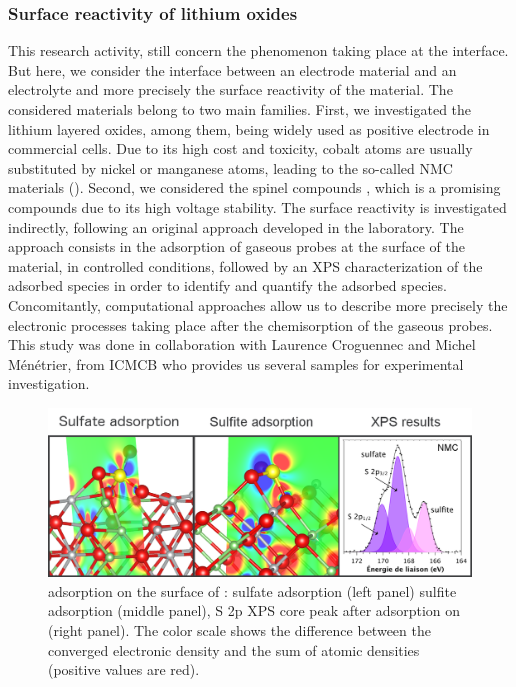\documentclass[11pt]{artuppax}
\newcounter{subsec}[section]
\begin{document}
\subsubsection{Surface reactivity of lithium oxides}

This research activity, still concern the phenomenon taking place at the interface. But here, we consider
the interface between an electrode material and an electrolyte and more precisely the surface reactivity
of the material. The considered materials belong to two main families. First, we investigated the lithium
layered oxides, among them,  being widely used as positive electrode in commercial cells.
Due to its high cost and toxicity, cobalt atoms are usually substituted by nickel or manganese atoms,
leading to the so-called NMC materials (). Second, we considered the spinel
compounds , which is a promising compounds due to its high voltage stability. The
surface reactivity is investigated indirectly, following an original approach developed in the laboratory.
The approach consists in the adsorption of gaseous probes at the surface of the material, in controlled conditions,
followed by an XPS characterization of the adsorbed species in order to identify and quantify the adsorbed
species. Concomitantly, computational approaches allow us to
describe more precisely the electronic processes taking place after the chemisorption of the gaseous
probes. This study was done in collaboration with Laurence
Croguennec and Michel Ménétrier, from ICMCB who provides us several samples for experimental investigation.

\begin{figure}[h]
    \centering
    \includegraphics[width=.8\textwidth]{img/so2}
    \caption{ adsorption on the surface of : sulfate adsorption (left panel)
    sulfite adsorption (middle panel), S 2p XPS core peak after  adsorption on
    (right panel). The color scale shows
    the difference between the converged electronic density and the sum of atomic densities
    (positive values are red).}
    \label{fig:SO2}
\end{figure}
\end{document}
